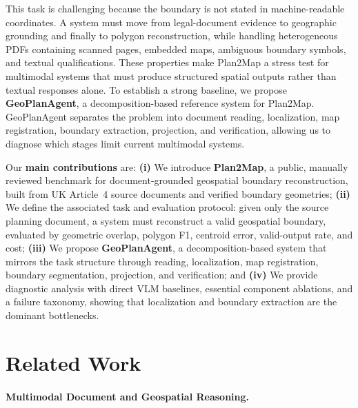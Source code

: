 \documentclass[11pt]{article}
\begin{document}
This task is challenging because the boundary is not stated in machine-readable coordinates. A system must move from legal-document evidence to geographic grounding and finally to polygon reconstruction, while handling heterogeneous PDFs containing scanned pages, embedded maps, ambiguous boundary symbols, and textual qualifications. These properties make Plan2Map a stress test for multimodal systems that must produce structured spatial outputs rather than textual responses alone. To establish a strong baseline, we propose \textbf{GeoPlanAgent}, a decomposition-based reference system for Plan2Map. GeoPlanAgent separates the problem into document reading, localization, map registration, boundary extraction, projection, and verification, allowing us to diagnose which stages limit current multimodal systems.
 
Our \textbf{main contributions} are: \textbf{(i)} We introduce \textbf{Plan2Map}, a public, manually reviewed benchmark for document-grounded geospatial boundary reconstruction, built from UK Article~4 source documents and verified boundary geometries; \textbf{(ii)} We define the associated task and evaluation protocol: given only the source planning document, a system must reconstruct a valid geospatial boundary, evaluated by geometric overlap, polygon F1, centroid error, valid-output rate, and cost; \textbf{(iii)} We propose \textbf{GeoPlanAgent}, a decomposition-based system that mirrors the task structure through reading, localization, map registration, boundary segmentation, projection, and verification; and \textbf{(iv)} We provide diagnostic analysis with direct VLM baselines, essential component ablations, and a failure taxonomy, showing that localization and boundary extraction are the dominant bottlenecks.


\section{Related Work}

\paragraph{Multimodal Document and Geospatial Reasoning.}
\end{document}
